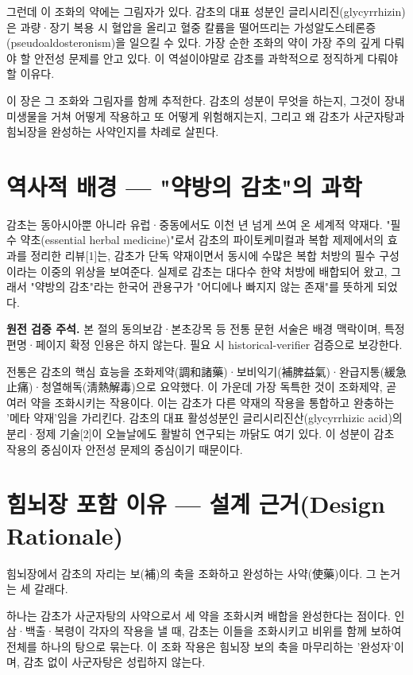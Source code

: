 \documentclass[12pt,oneside]{book}
\newenvironment{authnote}
  {\par\smallskip\begingroup\leftskip=6mm\rightskip=3mm\small\color{muted}\noindent\ignorespaces}
  {\par\endgroup\smallskip}
\begin{document}
그런데 이 조화의 약에는 그림자가 있다. 감초의 대표 성분인 글리시리진(glycyrrhizin)은 과량·장기 복용 시 혈압을 올리고 혈중 칼륨을 떨어뜨리는 가성알도스테론증(pseudoaldosteronism)을 일으킬 수 있다. 가장 순한 조화의 약이 가장 주의 깊게 다뤄야 할 안전성 문제를 안고 있다. 이 역설이야말로 감초를 과학적으로 정직하게 다뤄야 할 이유다.

이 장은 그 조화와 그림자를 함께 추적한다. 감초의 성분이 무엇을 하는지, 그것이 장내미생물을 거쳐 어떻게 작용하고 또 어떻게 위험해지는지, 그리고 왜 감초가 사군자탕과 힘뇌장을 완성하는 사약인지를 차례로 살핀다.

\section{역사적 배경 — "약방의 감초"의 과학}

감초는 동아시아뿐 아니라 유럽·중동에서도 이천 년 넘게 쓰여 온 세계적 약재다. "필수 약초(essential herbal medicine)"로서 감초의 파이토케미컬과 복합 제제에서의 효과를 정리한 리뷰[1]는, 감초가 단독 약재이면서 동시에 수많은 복합 처방의 필수 구성이라는 이중의 위상을 보여준다. 실제로 감초는 대다수 한약 처방에 배합되어 왔고, 그래서 "약방의 감초"라는 한국어 관용구가 "어디에나 빠지지 않는 존재"를 뜻하게 되었다.

\begin{authnote}\textbf{원전 검증 주석.} 본 절의 동의보감·본초강목 등 전통 문헌 서술은 배경 맥락이며, 특정 편명·페이지 확정 인용은 하지 않는다. 필요 시 historical-verifier 검증으로 보강한다.\end{authnote}

전통은 감초의 핵심 효능을 조화제약(調和諸藥)·보비익기(補脾益氣)·완급지통(緩急止痛)·청열해독(淸熱解毒)으로 요약했다. 이 가운데 가장 독특한 것이 조화제약, 곧 여러 약을 조화시키는 작용이다. 이는 감초가 다른 약재의 작용을 통합하고 완충하는 '메타 약재'임을 가리킨다. 감초의 대표 활성성분인 글리시리진산(glycyrrhizic acid)의 분리·정제 기술[2]이 오늘날에도 활발히 연구되는 까닭도 여기 있다. 이 성분이 감초 작용의 중심이자 안전성 문제의 중심이기 때문이다.

\section{힘뇌장 포함 이유 — 설계 근거(Design Rationale)}

힘뇌장에서 감초의 자리는 보(補)의 축을 조화하고 완성하는 사약(使藥)이다. 그 논거는 세 갈래다.

하나는 감초가 사군자탕의 사약으로서 세 약을 조화시켜 배합을 완성한다는 점이다. 인삼·백출·복령이 각자의 작용을 낼 때, 감초는 이들을 조화시키고 비위를 함께 보하여 전체를 하나의 탕으로 묶는다. 이 조화 작용은 힘뇌장 보의 축을 마무리하는 '완성자'이며, 감초 없이 사군자탕은 성립하지 않는다.
\end{document}
